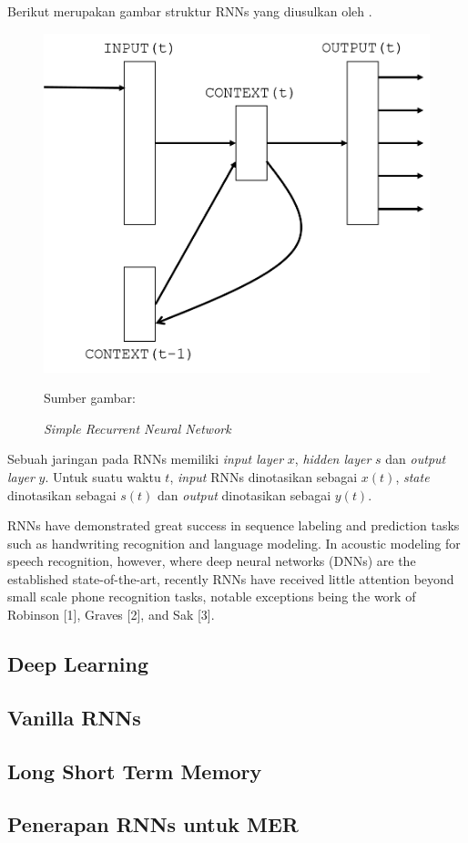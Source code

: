 Berikut merupakan gambar struktur RNNs yang diusulkan oleh \cite{elman1990finding}.
\begin{figure}
	\centering
	\includegraphics[width=0.55\linewidth]{images/simple_rnn}
	\caption{\textit{Simple Recurrent Neural Network}} {Sumber gambar: \cite{mikolov2010recurrent}}
	\label{fig:simplernn}
\end{figure}

Sebuah jaringan pada RNNs memiliki \textit{input layer} $ x $, \textit{hidden layer} $ s $ dan \textit{output layer} $ y $. Untuk suatu waktu $ t $, \textit{input} RNNs dinotasikan sebagai $ x(t) $, \textit{state} dinotasikan sebagai $ s(t) $ dan \textit{output} dinotasikan sebagai $ y(t) $.

RNNs have demonstrated great success
in sequence labeling and prediction tasks such as handwriting
recognition and language modeling. In acoustic modeling
for speech recognition, however, where deep neural networks
(DNNs) are the established state-of-the-art, recently RNNs have
received little attention beyond small scale phone recognition
tasks, notable exceptions being the work of Robinson [1],
Graves [2], and Sak [3].
\subsection{Deep Learning}
\subsection{Vanilla RNNs}
\subsection{Long Short Term Memory}
\subsection{Penerapan RNNs untuk MER}

